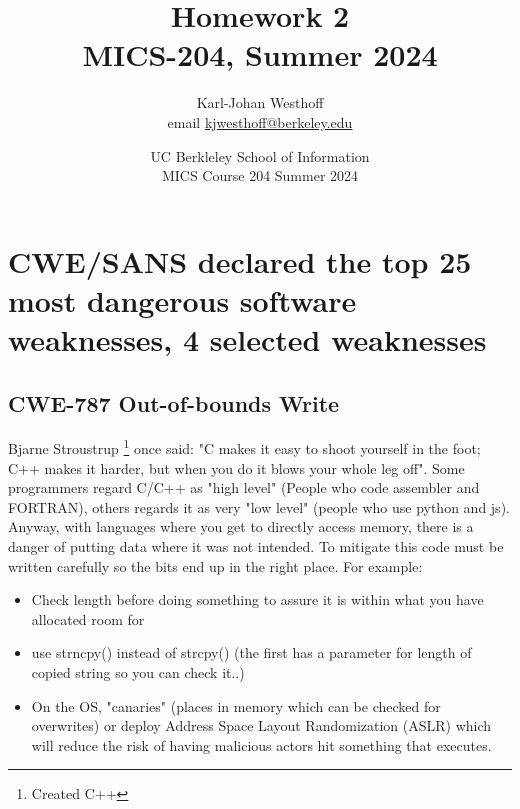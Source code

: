 \documentclass[
	letterpaper, %
	10pt, %
	unnumberedsections, %
	twoside, %
]{LTJournalArticle}
\title{Homework 2 \\ MICS-204, Summer 2024} %
\author{
	Karl-Johan Westhoff \\
	email \href{mailto:kjwesthoff@berkeley.edu}{kjwesthoff@berkeley.edu}
}
\date{UC Berkleley School of Information \\
MICS Course 204 Summer 2024
}
\begin{document}
\onecolumn
\maketitle %


\section{CWE/SANS declared the top 25 most dangerous software weaknesses, 4 selected weaknesses}

\subsection{CWE-787 Out-of-bounds Write}
Bjarne Stroustrup \footnote{Created C++} once said: "C makes it easy to shoot yourself in the foot; C++ makes it harder, but when you do it blows your whole leg off"\cite{BjarneStroustrupHomepage}. Some programmers regard C/C++ as "high level" (People who code assembler and FORTRAN), others regards it as very "low level" (people who use python and js). Anyway, with languages where you get to directly access memory, there is a danger of putting data where it was not intended. To mitigate this code must be written carefully so the bits end up in the right place. For example:

\begin{itemize}
	\item Check length before doing something to assure it is within what you have allocated room for
	\item use strncpy() instead of strcpy() (the first has a parameter for length of copied string so you can check it..)
	\item On the OS, "canaries" (places in memory which can be checked for overwrites) or deploy Address Space Layout Randomization (ASLR) which will reduce the risk of having malicious actors hit something that executes. 
\end{itemize}
\end{document}
